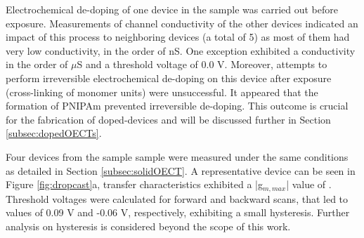 Electrochemical de-doping of one device in the sample was carried out before exposure. Measurements of channel conductivity of the other devices indicated an impact of this process to neighboring devices (a total of 5) as most of them had very low conductivity, in the order of nS. One exception exhibited a conductivity in the order of $\mu$S and a threshold voltage of 0.0 V. Moreover, attempts to perform irreversible electrochemical de-doping on this device after exposure (cross-linking of monomer units) were unsuccessful. It appeared that the formation of PNIPAm prevented irreversible de-doping. This outcome is crucial for the fabrication of doped-devices and will be discussed further in Section \ref{subsec:dopedOECTs}.

Four devices from the sample sample were measured under the same conditions as detailed in Section \ref{subsec:solidOECT}. A representative device can be seen in Figure \ref{fig:dropcast}a, transfer characteristics exhibited a |g$_{m,max}$| value of . Threshold voltages were calculated for forward and backward scans, that led to values of 0.09 V and -0.06 V, respectively, exhibiting a small hysteresis. Further analysis on hysteresis is considered beyond the scope of this work. 

